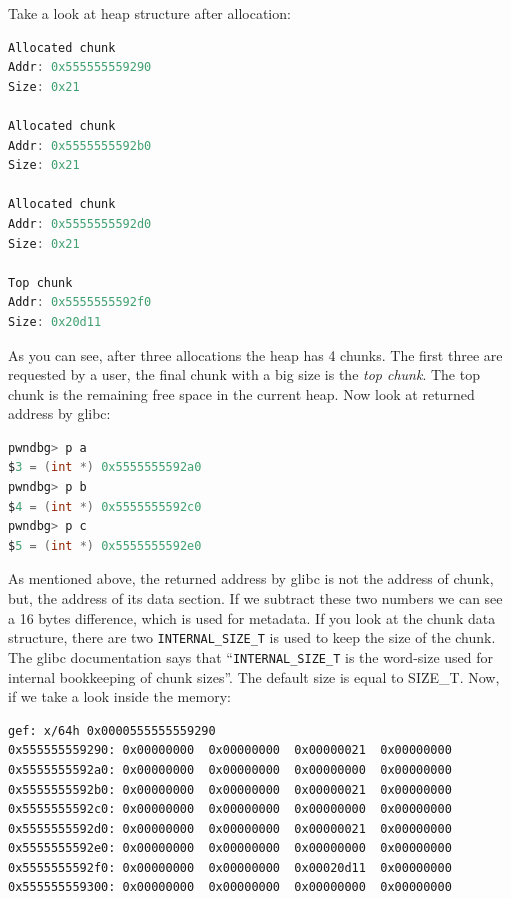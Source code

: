 \documentclass{masterthesis}
\newcommand*\sizet{SIZE\_T}
\newcommand*\libc{glibc}
\newcommand{\glnote}[1]{\todo[color=yellow!20]{#1}}
\begin{document}
Take a look at heap structure after allocation:

\begin{lstlisting}[language=c,frame=tlrb]
Allocated chunk
Addr: 0x555555559290
Size: 0x21

Allocated chunk
Addr: 0x5555555592b0
Size: 0x21

Allocated chunk
Addr: 0x5555555592d0
Size: 0x21

Top chunk
Addr: 0x5555555592f0
Size: 0x20d11
\end{lstlisting}

As you can see, after three allocations the heap has 4 chunks. The first three are requested by a user, the final chunk with a big size is the \emph{top chunk}. The top chunk is the remaining free space in the current heap. Now look at returned address by \libc{}:

\begin{lstlisting}[language=c,frame=tlrb]
pwndbg> p a
$3 = (int *) 0x5555555592a0
pwndbg> p b
$4 = (int *) 0x5555555592c0
pwndbg> p c
$5 = (int *) 0x5555555592e0
\end{lstlisting}

As mentioned above, the returned address by \libc{} is not the address of chunk, but, the address of its data section. If we subtract these two numbers we can see a 16 bytes difference, which is used for metadata. If you look at the chunk data structure, there are two \lstinline{INTERNAL_SIZE_T} is used to keep the size of the chunk. The \libc{} documentation says that ``\lstinline{INTERNAL_SIZE_T} is the word-size used for internal bookkeeping of chunk sizes''. The default size is equal to \sizet{}. Now, if we take a look inside the memory:\glnote{replace with 64-bit word dump}

\begin{lstlisting}[frame=tlrb]
gef: x/64h 0x0000555555559290
0x555555559290:	0x00000000	0x00000000	0x00000021	0x00000000
0x5555555592a0:	0x00000000	0x00000000	0x00000000	0x00000000
0x5555555592b0:	0x00000000	0x00000000	0x00000021	0x00000000
0x5555555592c0:	0x00000000	0x00000000	0x00000000	0x00000000
0x5555555592d0:	0x00000000	0x00000000	0x00000021	0x00000000
0x5555555592e0:	0x00000000	0x00000000	0x00000000	0x00000000
0x5555555592f0:	0x00000000	0x00000000	0x00020d11	0x00000000
0x555555559300:	0x00000000	0x00000000	0x00000000	0x00000000
\end{lstlisting}
\end{document}
